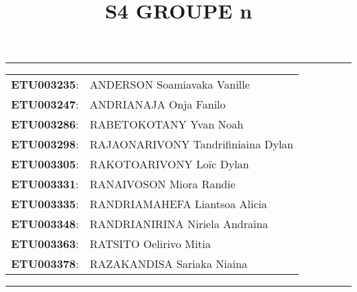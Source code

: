 \documentclass[a4paper,12pt]{article}
\begin{document}
	
\title{\textbf{S4 GROUPE n}}
\date{}
\maketitle

\hrule
\vspace{1em}

\begin{tabular}{rl}
	\textbf{ETU003235}: & ANDERSON Soamiavaka Vanille \\
	\textbf{ETU003247}: & ANDRIANAJA Onja Fanilo \\
	\textbf{ETU003286}: & RABETOKOTANY Yvan Noah \\
	\textbf{ETU003298}: & RAJAONARIVONY Tandrifiniaina Dylan \\
	\textbf{ETU003305}: & RAKOTOARIVONY Loïc Dylan \\
	\textbf{ETU003331}: & RANAIVOSON Miora Randie \\
	\textbf{ETU003335}: & RANDRIAMAHEFA Liantsoa Alicia \\
	\textbf{ETU003348}: & RANDRIANIRINA Niriela Andraina \\
	\textbf{ETU003363}: & RATSITO Oelirivo Mitia \\
	\textbf{ETU003378}: & RAZAKANDISA Sariaka Niaina \\
\end{tabular}

\vspace{1em}
\hrule

\newpage
\end{document}
